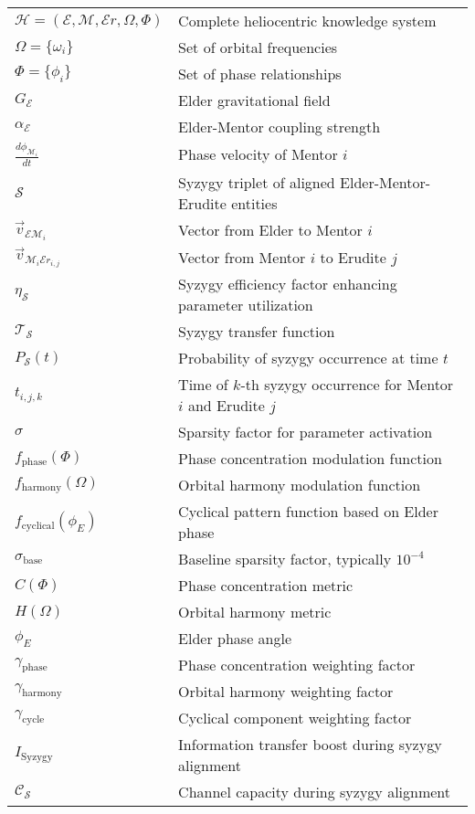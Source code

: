 \begin{tabular}{p{3cm} p{12cm}}
$\mathcal{H} = (\mathcal{E}, \mathcal{M}, \mathcal{E}r, \Omega, \Phi)$ & Complete heliocentric knowledge system \\
$\Omega = \{\omega_i\}$ & Set of orbital frequencies \\
$\Phi = \{\phi_i\}$ & Set of phase relationships \\
$G_{\mathcal{E}}$ & Elder gravitational field \\
$\alpha_{\mathcal{E}}$ & Elder-Mentor coupling strength \\
$\frac{d\phi_{\mathcal{M}_i}}{dt}$ & Phase velocity of Mentor $i$ \\
$\mathcal{S}$ & Syzygy triplet of aligned Elder-Mentor-Erudite entities \\
$\vec{v}_{\mathcal{E}\mathcal{M}_i}$ & Vector from Elder to Mentor $i$ \\
$\vec{v}_{\mathcal{M}_i\mathcal{E}r_{i,j}}$ & Vector from Mentor $i$ to Erudite $j$ \\
$\eta_\mathcal{S}$ & Syzygy efficiency factor enhancing parameter utilization \\
$\mathcal{T}_{\mathcal{S}}$ & Syzygy transfer function \\
$P_{\mathcal{S}}(t)$ & Probability of syzygy occurrence at time $t$ \\
$t_{i,j,k}$ & Time of $k$-th syzygy occurrence for Mentor $i$ and Erudite $j$ \\
$\sigma$ & Sparsity factor for parameter activation \\
$f_{\text{phase}}(\Phi)$ & Phase concentration modulation function \\
$f_{\text{harmony}}(\Omega)$ & Orbital harmony modulation function \\
$f_{\text{cyclical}}(\phi_E)$ & Cyclical pattern function based on Elder phase \\
$\sigma_{\text{base}}$ & Baseline sparsity factor, typically $10^{-4}$ \\
$C(\Phi)$ & Phase concentration metric \\
$H(\Omega)$ & Orbital harmony metric \\
$\phi_E$ & Elder phase angle \\
$\gamma_{\text{phase}}$ & Phase concentration weighting factor \\
$\gamma_{\text{harmony}}$ & Orbital harmony weighting factor \\
$\gamma_{\text{cycle}}$ & Cyclical component weighting factor \\
$I_{\text{Syzygy}}$ & Information transfer boost during syzygy alignment \\
$\mathcal{C}_{\mathcal{S}}$ & Channel capacity during syzygy alignment \\
\end{tabular}

